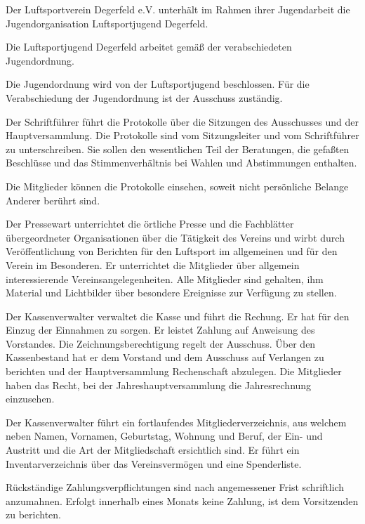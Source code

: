 \documentclass[10pt,a4paper,parskip=half]{scrartcl}
\begin{document}
\begin{contract}
    Der Luftsportverein Degerfeld e.V. unterhält im Rahmen ihrer Jugendarbeit die Jugendorganisation Luftsportjugend Degerfeld.
    
    Die Luftsportjugend Degerfeld arbeitet gemäß der verabschiedeten Jugendordnung.
    
    Die Jugendordnung wird von der Luftsportjugend beschlossen. Für die Verabschiedung der Jugendordnung ist der Ausschuss zuständig.
    
    Der Schriftführer führt die Protokolle über die Sitzungen des Ausschusses und der Hauptversammlung.
    Die Protokolle sind vom Sitzungsleiter und vom Schriftführer zu unterschreiben.
    Sie sollen den wesentlichen Teil der Beratungen,
    die gefaßten Beschlüsse und das Stimmenverhältnis bei Wahlen und Abstimmungen enthalten.
    
    Die Mitglieder können die Protokolle einsehen,
    soweit nicht persönliche Belange Anderer berührt sind.
    
    Der Pressewart unterrichtet die örtliche Presse und die Fachblätter übergeordneter Organisationen über die Tätigkeit des Vereins und wirbt durch Veröffentlichung von Berichten für den Luftsport im allgemeinen und für den Verein im Besonderen.
    Er unterrichtet die Mitglieder über allgemein interessierende Vereinsangelegenheiten.
    Alle Mitglieder sind gehalten, ihm Material und Lichtbilder über besondere Ereignisse zur Verfügung zu stellen.
    
    Der Kassenverwalter verwaltet die Kasse und führt die Rechung.
    Er hat für den Einzug der Einnahmen zu sorgen.
    Er leistet Zahlung auf Anweisung des Vorstandes.
    Die Zeichnungsberechtigung regelt der Ausschuss.
    Über den Kassenbestand hat er dem Vorstand und dem Ausschuss auf Verlangen zu berichten und der Hauptversammlung Rechenschaft abzulegen.
    Die Mitglieder haben das Recht,
    bei der Jahreshauptversammlung die Jahresrechnung einzusehen.
    
    Der Kassenverwalter führt ein fortlaufendes Mitgliederverzeichnis,
    aus welchem neben Namen,
    Vornamen,
    Geburtstag,
    Wohnung und Beruf,
    der Ein- und Austritt und die Art der Mitgliedschaft ersichtlich sind.
    Er führt ein Inventarverzeichnis über das Vereinsvermögen und eine Spenderliste.
    
    Rückständige Zahlungsverpflichtungen sind nach angemessener Frist schriftlich anzumahnen.
    Erfolgt innerhalb eines Monats keine Zahlung,
    ist dem Vorsitzenden zu berichten.
    

\end{contract}
\end{document}

